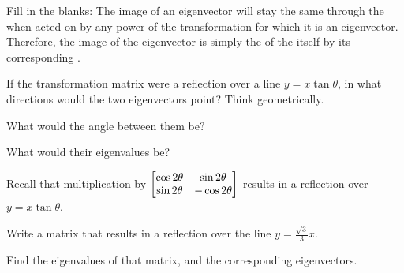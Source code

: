 \documentclass[../gatm_answers.tex]{subfiles}
\begin{document}
\begin{outer_problem}
\item Fill in the blanks: The image of an eigenvector will stay the same \underline{\phantom{00000}} through the \underline{\phantom{00000}} when acted on by any power of the transformation \underline{\phantom{00000}} for which it is an eigenvector. Therefore, the image of the eigenvector is simply the \underline{\phantom{00000}} of the \underline{\phantom{00000}} itself by its corresponding \underline{\phantom{00000}}.
\end{outer_problem}

\begin{outer_problem}
\item
\end{outer_problem}

\begin{inner_problem}[start=1]
\item If the transformation matrix were a reflection over a line $y=x\tan\theta$, in what directions would the two eigenvectors point? Think geometrically.
\end{inner_problem}

\begin{inner_problem}
\item What would the angle between them be?
\end{inner_problem}

\begin{inner_problem}
\item What would their eigenvalues be?
\end{inner_problem}

\begin{outer_problem}
\item Recall that multiplication by $\begin{bmatrix} \cos 2\theta & \sin 2\theta \\ \sin 2\theta & -\cos 2\theta \end{bmatrix}$ results in a reflection over $y=x\tan \theta$.
\end{outer_problem}

\begin{inner_problem}[start=1]
\item Write a matrix that results in a reflection over the line $y=\frac{\sqrt{3}}{3}x.$
\end{inner_problem}

\begin{inner_problem}
\item Find the eigenvalues of that matrix, and the corresponding eigenvectors.
\end{inner_problem}
\end{document}
